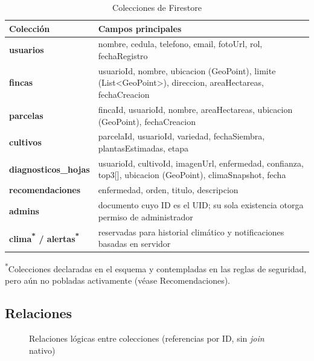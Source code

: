 \documentclass[12pt,a4paper]{article}
\begin{document}
\begin{table}[H]
\centering
\caption{Colecciones de Firestore}
\label{tab:firestore}
\renewcommand{\arraystretch}{1.3}
\begin{tabular}{>{\ttfamily\bfseries}p{3.4cm} p{9.7cm}}
\toprule
\normalfont\bfseries Colección & \bfseries\normalfont Campos principales \\
\midrule
usuarios & nombre, cedula, telefono, email, fotoUrl, rol, fechaRegistro \\
fincas & usuarioId, nombre, ubicacion (GeoPoint), limite (List\textless GeoPoint\textgreater), direccion, areaHectareas, fechaCreacion \\
parcelas & fincaId, usuarioId, nombre, areaHectareas, ubicacion (GeoPoint), fechaCreacion \\
cultivos & parcelaId, usuarioId, variedad, fechaSiembra, plantasEstimadas, etapa \\
diagnosticos\_hojas & usuarioId, cultivoId, imagenUrl, enfermedad, confianza, top3[], ubicacion (GeoPoint), climaSnapshot, fecha \\
recomendaciones & enfermedad, orden, titulo, descripcion \\
admins & documento cuyo ID es el UID; su sola existencia otorga permiso de administrador \\
clima\textsuperscript{*} / alertas\textsuperscript{*} & reservadas para historial climático y notificaciones basadas en servidor \\
\bottomrule
\end{tabular}
\end{table}
{\footnotesize\textsuperscript{*}Colecciones declaradas en el esquema y
contempladas en las reglas de seguridad, pero aún no pobladas activamente (véase
Recomendaciones).}

\subsection{Relaciones}

\begin{figure}[H]
\centering
{}
\caption{Relaciones lógicas entre colecciones (referencias por ID, sin \textit{join} nativo)}
\label{fig:er}
\end{figure}
\end{document}
